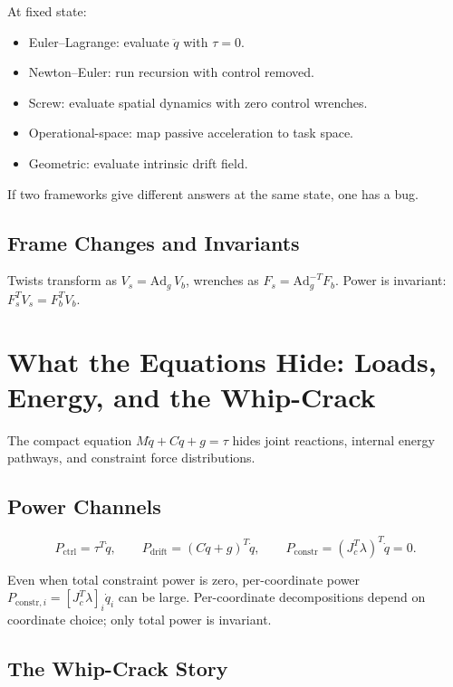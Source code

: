 \documentclass[11pt]{article}
\begin{document}
At fixed state:
\begin{itemize}
\item Euler--Lagrange: evaluate $\ddot{q}$ with $\tau=0$.
\item Newton--Euler: run recursion with control removed.
\item Screw: evaluate spatial dynamics with zero control wrenches.
\item Operational-space: map passive acceleration to task space.
\item Geometric: evaluate intrinsic drift field.
\end{itemize}

If two frameworks give different answers at the same state, one has a bug.

\subsection{Frame Changes and Invariants}

Twists transform as $V_s = \mathrm{Ad}_g\, V_b$, wrenches as $F_s = \mathrm{Ad}_g^{-T} F_b$. Power is invariant: $F_s^T V_s = F_b^T V_b$.


\section{What the Equations Hide: Loads, Energy, and the Whip-Crack}\label{sec:hidden-loads}

The compact equation $M\ddot{q}+C\dot{q}+g=\tau$ hides joint reactions, internal energy pathways, and constraint force distributions.

\subsection{Power Channels}

\begin{equation}
P_{\mathrm{ctrl}}=\tau^T\dot{q}, \qquad
P_{\mathrm{drift}}=(C\dot{q}+g)^T\dot{q}, \qquad
P_{\mathrm{constr}}=(J_c^T\lambda)^T\dot{q}=0.
\end{equation}

Even when total constraint power is zero, per-coordinate power $P_{\mathrm{constr},i}=[J_c^T\lambda]_i\dot{q}_i$ can be large. Per-coordinate decompositions depend on coordinate choice; only total power is invariant.

\subsection{The Whip-Crack Story}
\end{document}
